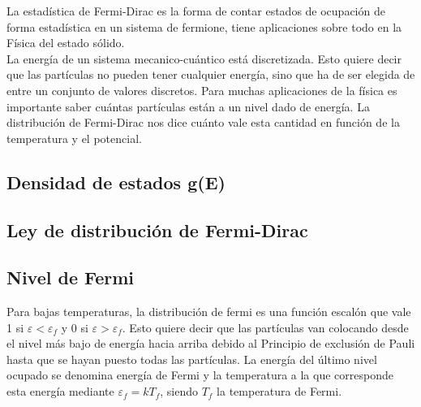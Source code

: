 \documentclass[oneside]{book}
\numberwithin{equation}{section}
\numberwithin{figure}{section}
\numberwithin{table}{section}
\begin{document}
			La estadística de Fermi-Dirac es la forma de contar estados de ocupación de forma estadística en un sistema de fermione, tiene aplicaciones sobre todo en la Física del estado sólido.\\
			
			La energía de un sistema mecanico-cuántico está discretizada. Esto quiere decir que las partículas no pueden tener cualquier energía, sino que ha de ser elegida de entre un conjunto de valores discretos. Para muchas aplicaciones de la física es importante saber cuántas partículas están a un nivel dado de energía. La distribución de Fermi-Dirac nos dice cuánto vale esta cantidad en función de la temperatura y el potencial.\\
			
			\subsection{Densidad de estados g(E)}
			
				\begin{center}
				\end{center}			
			
			\subsection{Ley de distribución de Fermi-Dirac}
			
				\begin{center}
				\end{center}
			
			\subsection{Nivel de Fermi}
			
				Para bajas temperaturas, la distribución de fermi es una función escalón que vale 1 si $\varepsilon<\varepsilon_f$ y 0 si $\varepsilon>\varepsilon_f$. Esto quiere decir que las partículas van colocando desde el nivel más bajo de energía hacia arriba debido al Principio de exclusión de Pauli hasta que se hayan puesto todas las partículas. La energía del último nivel ocupado se denomina energía de Fermi y la temperatura a la que corresponde esta energía mediante $\varepsilon_f=k T_f$, siendo $T_f$ la temperatura de Fermi.\\		
				
\end{document}

